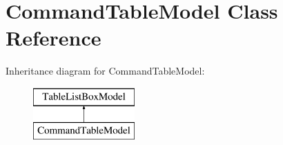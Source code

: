 \hypertarget{class_command_table_model}{}\section{Command\+Table\+Model Class Reference}
\label{class_command_table_model}
Inheritance diagram for Command\+Table\+Model\+:\begin{figure}[H]
\begin{center}
\leavevmode
\includegraphics[height=2.000000cm]{class_command_table_model}
\end{center}
\end{figure}
